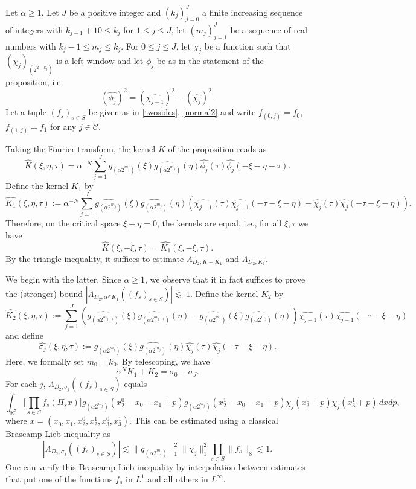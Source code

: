 \documentclass[12pt,reqno]{amsart}
\theoremstyle{plain}
\theoremstyle{definition}
\numberwithin{equation}{section}
\newcommand{\R}{{\mathbb R}}
\begin{document}
 


Let $\alpha\ge 1$. Let $J$ be a positive integer and $(k_j)_{j=0}^J$   a   finite increasing sequence of integers with $k_{j-1}+10 \leq k_{j}$
for $1\le j \leq J$, let $(m_j)_{j=1}^J$ be a sequence of real numbers with
$k_j-1\le m_j\le k_j$. For $0\le j\le J$, let $\chi_j$
be a function such that ${(\chi_j)_{(2^{2-k_j})}}$ is a left window
and let $\phi_{j}$ be as in the statement of the proposition, i.e. 
$$ (\widehat{\phi_{j}})^2=(\widehat{\chi_{j-1}})^2-
(\widehat{\chi_{j}})^2.$$
Let a tuple $(f_s)_{s\in S}$ be given as in \eqref{twosides}, \eqref{normal2}
and write $f_{(0,j)}=f_0$, $f_{(1,j)}=f_1$
for any $j \in \mathcal C$.





Taking the Fourier transform, the kernel $K$ of the proposition reads as 
\[ \widehat{K}(\xi,\eta,\tau) =\alpha^{-N}\sum_{j=1}^J \widehat{g_{(\alpha 2^{m_j})}} (\xi)  \widehat{g_{(\alpha 2^{m_j})}}(\eta)  \widehat{\phi_{j}}(\tau) \widehat{\phi_{j}}(-\xi-\eta-\tau).  \]
Define the kernel $K_1$ by
 \[ \widehat{K_1}(\xi,\eta,\tau) :=\alpha^{-N}\sum_{j=1}^J \widehat{g_{(\alpha 2^{m_j})}}(\xi)\widehat{g_{(\alpha 2^{m_j})}}(\eta) (\widehat{\chi_{j-1}}(\tau)\widehat{\chi_{j-1}}(-\tau-\xi-\eta) - \widehat{\chi_{j}}(\tau)\widehat{\chi_{j}}(-\tau-\xi-\eta)  ). \]
Therefore,     on the critical space $\xi+\eta=0$, the kernels are equal, i.e., for all $\xi,\tau$ we have 
\[\widehat{K}(\xi,-\xi,\tau) = \widehat{K_1}(\xi,-\xi,\tau).  \]
By the triangle inequality, it suffices to estimate $\Lambda_{D_2,K-K_1}$ and  $\Lambda_{D_2,K_1}$. 

We begin with the latter. 
Since $\alpha \geq 1$, we observe that it in fact suffices to prove the (stronger) bound $|\Lambda_{D_2,\alpha^{N}K_1}((f_s)_{s\in S})| \lesssim~1$. 
Define the kernel $K_2$ by 
\[\widehat{K_2}(\xi,\eta,\tau) := \sum_{j=1}^J (\widehat{g_{(\alpha 2^{m_{j-1}})}}(\xi)\widehat{g_{(\alpha 2^{m_{j-1}})}}(\eta) - \widehat{g_{(\alpha 2^{m_j})}}(\xi)\widehat{g_{(\alpha 2^{m_j})}}(\eta)) \widehat{\chi_{j-1}}(\tau)\widehat{\chi_{j-1}}(-\tau-\xi-\eta)  \]
and define
\[\widehat{\sigma_{j}}(\xi,\eta,\tau):= \widehat{g_{(\alpha 2^{m_j})}}(\xi)\widehat{g_{(\alpha 2^{m_j})}}(\eta) \widehat{\chi_{j}}(\tau)\widehat{\chi_{j}}(-\tau-\xi-\eta).  \]
Here, we formally set $m_0=k_0$.
By telescoping, we have
\[\alpha^{N}K_1+K_2 = \sigma_0 - \sigma_J.\]
For each $j$, $\Lambda_{D_2,\sigma_{j}}((f_s)_{s\in S})$ equals   
\[  \int_{\R^7}        \Big[\prod_{s\in S} f_s(\Pi_s x)\Big ] g_{(\alpha 2^{m_j})} (x_2^0-x_0-x_1+p) g_{(\alpha 2^{m_j})}(x_2^1-x_0-x_1+p)  \chi_j (x_3^{{0}}+p)\chi_j (x_3^1+p)  \,dxdp, \]
where $x=(x_0,x_1,x_2^0,x_2^1,x_3^0,x_3^1)$. 
This can be {estimated} using a classical Brascamp-Lieb inequality as
\begin{equation}\label{sigmabl}
 |\Lambda_{D_2,\sigma_{j}}((f_s)_{s\in S})| \lesssim \|g_{(\alpha 2^{m_j})}\|^2_1 \|\chi_{j}\|_1^2\prod_{s\in S} \|f_s\|_8\lesssim 1.   
\end{equation}
One can verify this Brascamp-Lieb inequality
by interpolation between estimates that put one of the functions $f_s$ in $L^1$ and all others in $L^\infty$.
\end{document}
